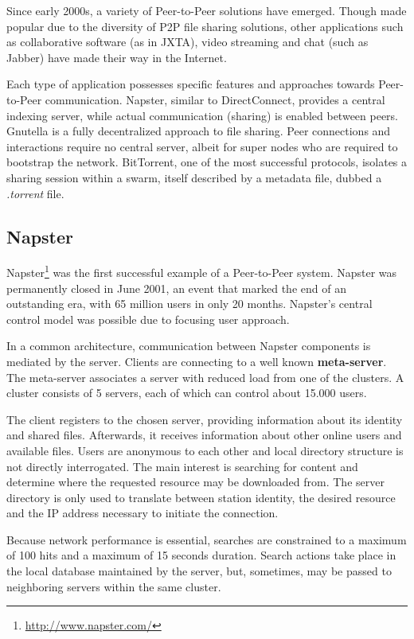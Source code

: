 Since early 2000s, a variety of
Peer-to-Peer solutions have emerged. Though made popular due to the diversity
of P2P file sharing solutions, other applications such as collaborative
software (as in JXTA), video streaming and chat (such as Jabber) have made
their way in the Internet.

Each type of application possesses specific features and approaches towards
Peer-to-Peer communication. Napster, similar to DirectConnect, provides a
central indexing server, while actual communication (sharing) is enabled
between peers. Gnutella is a fully decentralized approach to file sharing.
Peer connections and interactions require no central server, albeit for super
nodes who are required to bootstrap the network. BitTorrent, one of the most
successful protocols, isolates a sharing session within a swarm, itself
described by a metadata file, dubbed a \textit{.torrent} file.

\subsection{Napster}

Napster\footnote{\url{http://www.napster.com/}} was the first successful example of a Peer-to-Peer
system. Napster was permanently closed in June 2001, an event that marked the
end of an outstanding era, with 65 million users in only 20 months. Napster's
central control model was possible due to focusing user approach.

In a common architecture, communication between Napster components is mediated
by the server. Clients are connecting to a well known \textbf{meta-server}.
The meta-server associates a server with reduced load from one of the
clusters. A cluster consists of 5 servers, each of which can control about
15.000 users.

The client registers to the chosen server, providing information about its
identity and shared files. Afterwards, it receives information about other
online users and available files. Users are anonymous to each other and local
directory structure is not directly interrogated. The main interest is
searching for content and determine where the requested resource may be
downloaded from.  The server directory is only used to translate between
station identity, the desired resource and the IP address necessary to
initiate the connection.

Because network performance is essential, searches are constrained to a maximum
of 100 hits and a maximum of 15 seconds duration. Search actions take place
in the local database maintained by the server, but, sometimes, may be passed
to neighboring servers within the same cluster.

